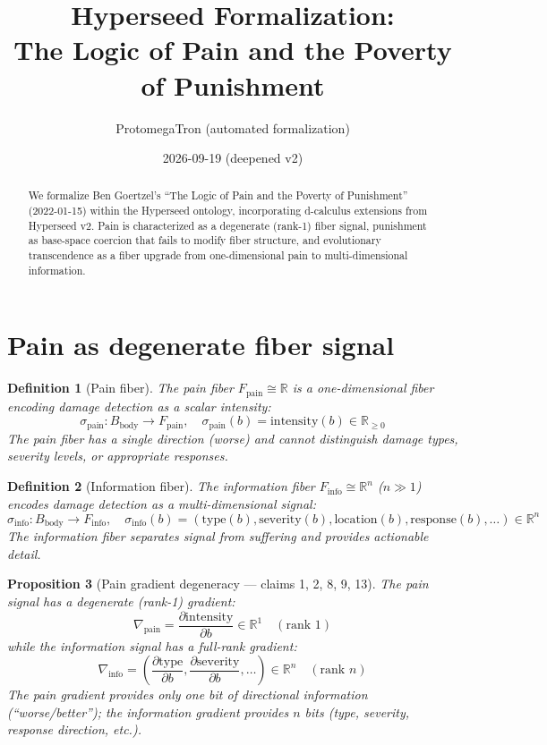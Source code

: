 \documentclass[11pt,a4paper]{article}
\title{Hyperseed Formalization:\\
  The Logic of Pain and the Poverty of Punishment}
\author{ProtomegaTron (automated formalization)}
\date{2026-09-19 (deepened v2)}
\newtheorem{definition}{Definition}[section]
\newtheorem{proposition}[definition]{Proposition}
\begin{document}
\maketitle

\begin{abstract}
We formalize Ben Goertzel's ``The Logic of Pain and the Poverty of
Punishment'' (2022-01-15) within the Hyperseed ontology, incorporating
d-calculus extensions from Hyperseed v2. Pain is characterized as a
degenerate (rank-1) fiber signal, punishment as base-space coercion that
fails to modify fiber structure, and evolutionary transcendence as a fiber
upgrade from one-dimensional pain to multi-dimensional information.
\end{abstract}

\tableofcontents

\section{Pain as degenerate fiber signal}

\begin{definition}[Pain fiber]
The \emph{pain fiber} $F_{\text{pain}} \cong \mathbb{R}$ is a one-dimensional
fiber encoding damage detection as a scalar intensity:
\[
  \sigma_{\text{pain}}: B_{\text{body}} \to F_{\text{pain}}, \quad
  \sigma_{\text{pain}}(b) = \text{intensity}(b) \in \mathbb{R}_{\geq 0}
\]
The pain fiber has a single direction (worse) and cannot distinguish
damage types, severity levels, or appropriate responses.
\end{definition}

\begin{definition}[Information fiber]
The \emph{information fiber} $F_{\text{info}} \cong \mathbb{R}^n$ ($n \gg 1$)
encodes damage detection as a multi-dimensional signal:
\[
  \sigma_{\text{info}}: B_{\text{body}} \to F_{\text{info}}, \quad
  \sigma_{\text{info}}(b) = (\text{type}(b), \text{severity}(b),
    \text{location}(b), \text{response}(b), \ldots) \in \mathbb{R}^n
\]
The information fiber separates signal from suffering and provides
actionable detail.
\end{definition}

\begin{proposition}[Pain gradient degeneracy --- claims 1, 2, 8, 9, 13]
\label{prop:degeneracy}
The pain signal has a degenerate (rank-1) gradient:
\[
  \nabla_{\text{pain}} = \frac{\partial \text{intensity}}{\partial b}
  \in \mathbb{R}^1 \quad (\text{rank } 1)
\]
while the information signal has a full-rank gradient:
\[
  \nabla_{\text{info}} = \left(\frac{\partial \text{type}}{\partial b},
    \frac{\partial \text{severity}}{\partial b}, \ldots\right)
  \in \mathbb{R}^n \quad (\text{rank } n)
\]
The pain gradient provides only one bit of directional information
(``worse/better''); the information gradient provides $n$ bits
(type, severity, response direction, etc.).
\end{proposition}
\end{document}
